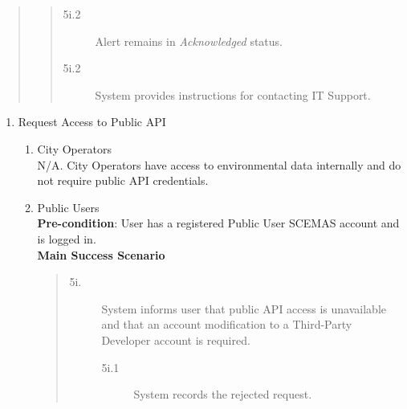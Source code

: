 \documentclass[]{article}
\begin{document}
\begin{enumerate}[{\bf BE6.}]
\begin{quote}
\begin{quote}
\begin{description}
\begin{description}
                            \item[\textmd{5i.2}] Alert remains in \textit{Acknowledged} status.
                            \item[\textmd{5i.2}] System provides instructions for contacting IT Support.
                        \end{description}
                    \end{description}
                \end{quote}
        	\end{quote}
\end{enumerate}

\begin{enumerate}[{\bf BE7.}]
    \item Request Access to Public API
        \begin{enumerate}[{\bf VP1.}]
            \item City Operators \\
                N/A. City Operators have access to environmental data internally and do not require public API credentials.

            \item Public Users \\
                \textbf{Pre-condition}: User has a registered Public User SCEMAS account and is logged in.\\
                \textbf{Main Success Scenario}
                \begin{quote}
                    \begin{description}
                        \item[\textmd{5i.}] System informs user that public API access is unavailable and that an account modification to a Third-Party Developer account is required.
                        \begin{description}
                            \item[\textmd{5i.1}] System records the rejected request.
                        \end{description}
                    \end{description}
                \end{quote}


\end{enumerate}
\end{enumerate}
\end{document}
